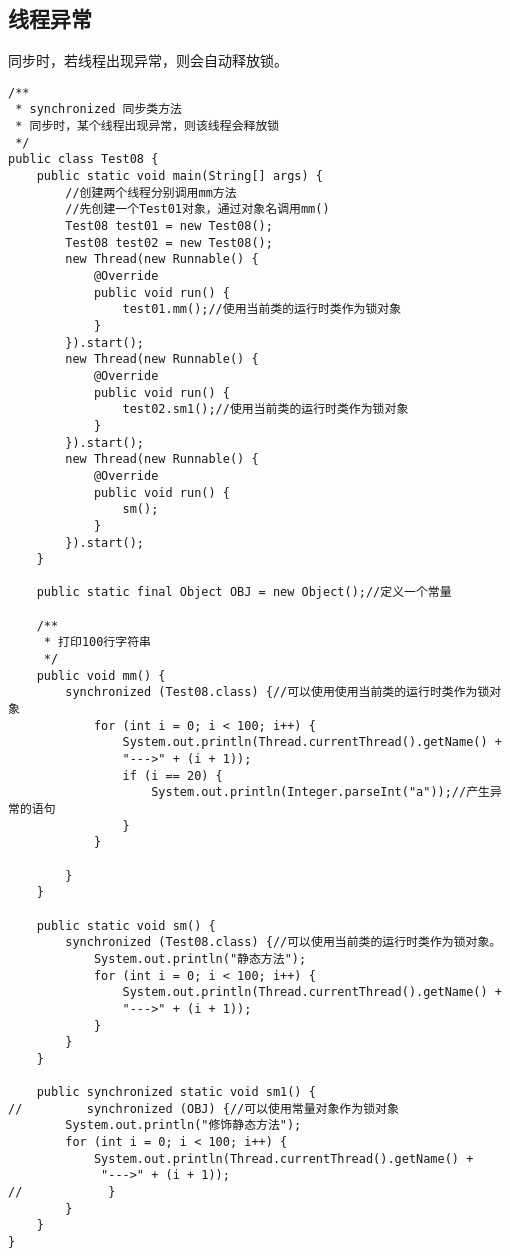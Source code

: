 \documentclass[a4paper]{report}
\begin{document}
\subsection{线程异常}
同步时，若线程出现异常，则会自动释放锁。
\begin{Verbatim}[frame=single,numbersep=5pt,xleftmargin=1.5em,xrightmargin=1.5em]
/**
 * synchronized 同步类方法
 * 同步时，某个线程出现异常，则该线程会释放锁
 */
public class Test08 {
    public static void main(String[] args) {
        //创建两个线程分别调用mm方法
        //先创建一个Test01对象，通过对象名调用mm()
        Test08 test01 = new Test08();
        Test08 test02 = new Test08();
        new Thread(new Runnable() {
            @Override
            public void run() {
                test01.mm();//使用当前类的运行时类作为锁对象
            }
        }).start();
        new Thread(new Runnable() {
            @Override
            public void run() {
                test02.sm1();//使用当前类的运行时类作为锁对象
            }
        }).start();
        new Thread(new Runnable() {
            @Override
            public void run() {
                sm();
            }
        }).start();
    }

    public static final Object OBJ = new Object();//定义一个常量

    /**
     * 打印100行字符串
     */
    public void mm() {
        synchronized (Test08.class) {//可以使用使用当前类的运行时类作为锁对象
            for (int i = 0; i < 100; i++) {
                System.out.println(Thread.currentThread().getName() +
                "--->" + (i + 1));
                if (i == 20) {
                    System.out.println(Integer.parseInt("a"));//产生异常的语句
                }
            }

        }
    }

    public static void sm() {
        synchronized (Test08.class) {//可以使用当前类的运行时类作为锁对象。
            System.out.println("静态方法");
            for (int i = 0; i < 100; i++) {
                System.out.println(Thread.currentThread().getName() +
                "--->" + (i + 1));
            }
        }
    }

    public synchronized static void sm1() {
//         synchronized (OBJ) {//可以使用常量对象作为锁对象
        System.out.println("修饰静态方法");
        for (int i = 0; i < 100; i++) {
            System.out.println(Thread.currentThread().getName() +
             "--->" + (i + 1));
//            }
        }
    }
}
\end{Verbatim}
\end{document}
